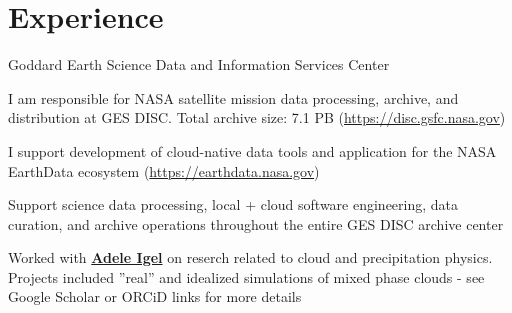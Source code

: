 \documentclass[]{deedy-resume-reversed}
\begin{document}
%
%

%
%

%
%

\begin{minipage}[t]{0.60\textwidth}


\section{Experience}
\vspace{\topsep} %
\begin{tightemize}
    \item Goddard Earth Science Data and Information Services Center
    \item I am responsible for NASA satellite mission data processing, archive, and distribution at GES DISC. Total archive size: 7.1 PB (\href{https://disc.gsfc.nasa.gov}{https://disc.gsfc.nasa.gov})
    \item I support development of cloud-native data tools and application for the NASA EarthData ecosystem (\href{https://earthdata.nasa.gov}{https://earthdata.nasa.gov})
    \item Support science data processing, local + cloud software engineering, data curation, and archive operations throughout the entire GES DISC archive center 
\end{tightemize}
\sectionsep

\begin{tightemize}
    \item Worked with \textbf{\href{https://adele.faculty.ucdavis.edu/}{Adele Igel}} on reserch related to cloud and precipitation physics. Projects included ”real” and idealized simulations of mixed phase clouds - see Google Scholar or ORCiD links for more details
\end{tightemize}
\sectionsep


\end{minipage}
\end{document}
